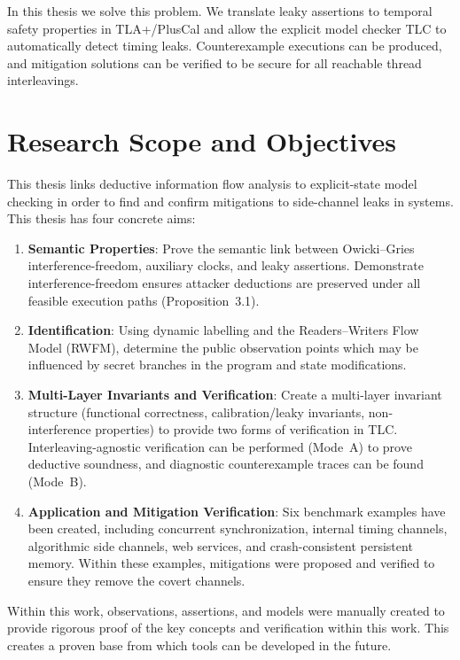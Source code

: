\documentclass[a4paper,12pt]{report}
\begin{document}
In this thesis we solve this problem. We translate leaky assertions to temporal safety properties in TLA+/PlusCal and allow the explicit model checker TLC to automatically detect timing leaks. Counterexample executions can be produced, and mitigation solutions can be verified to be secure for all reachable thread interleavings.

\section{Research Scope and Objectives}
\enlargethispage{1.5\baselineskip}
This thesis links deductive information flow analysis to explicit-state model checking in order to find and confirm mitigations to side-channel leaks in systems. This thesis has four concrete aims:
\begin{enumerate}[label=\arabic*., itemsep=0.04em, topsep=0.04em]
    \item \textbf{Semantic Properties}: Prove the semantic link between Owicki--Gries interference-freedom, auxiliary clocks, and leaky assertions. Demonstrate interference-freedom ensures attacker deductions are preserved under all feasible execution paths (Proposition~3.1).
    \item \textbf{Identification}: Using dynamic labelling and the Readers--Writers Flow Model (RWFM), determine the public observation points which may be influenced by secret branches in the program and state modifications.
    \item \textbf{Multi-Layer Invariants and Verification}: Create a multi-layer invariant structure (functional correctness, calibration/leaky invariants, non-interference properties) to provide two forms of verification in TLC. Interleaving-agnostic verification can be performed (Mode~A) to prove deductive soundness, and diagnostic counterexample traces can be found (Mode~B).
    \item \textbf{Application and Mitigation Verification}: Six benchmark examples have been created, including concurrent synchronization, internal timing channels, algorithmic side channels, web services, and crash-consistent persistent memory. Within these examples, mitigations were proposed and verified to ensure they remove the covert channels.
\end{enumerate}
Within this work, observations, assertions, and models were manually created to provide rigorous proof of the key concepts and verification within this work. This creates a proven base from which tools can be developed in the future.
\end{document}
